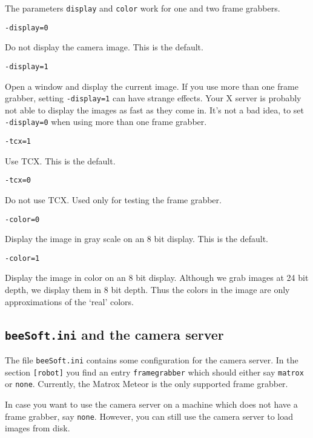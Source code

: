 \documentclass{article}
\begin{document}
The parameters \texttt{display} and \texttt{color} work for one and two frame
grabbers.

\begin{description}

\item \texttt{-display=0}
  
  Do not display the camera image. This is the default.

\item \texttt{-display=1}
  
  Open a window and display the current image. If you use more than one frame
  grabber, setting \texttt{-display=1} can have strange effects. Your X server
  is probably not able to display the images as fast as they come in. It's not
  a bad idea, to set \texttt{-display=0} when using more than one frame grabber.

\item \texttt{-tcx=1}
  
  Use TCX. This is the default.

\item \texttt{-tcx=0}
  
  Do not use TCX. Used only for testing the frame grabber.

\item \texttt{-color=0}
  
  Display the image in gray scale on an 8 bit display. This is the default.

\item \texttt{-color=1}
  
  Display the image in color on an 8 bit display. Although we grab images at
  24 bit depth, we display them in 8 bit depth. Thus the colors in the image
  are only approximations of the `real' colors.

\end{description}

\subsection{\texttt{beeSoft.ini} and the camera server}

The file \texttt{beeSoft.ini} contains some configuration for the camera
server.  In the section \texttt{[robot]} you find an entry
\texttt{framegrabber} which should either say \texttt{matrox} or
\texttt{none}. Currently, the Matrox Meteor is the only supported frame
grabber.  

In case you want to use the camera server on a machine which does not have a
frame grabber, say \texttt{none}. However, you can still use the camera server
to load images from disk.
\end{document}
